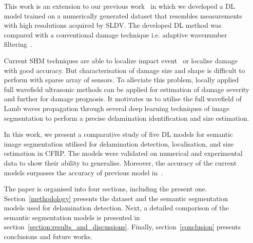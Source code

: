 This work is an extension to our previous work~\cite{Ijjeh2021} in which we developed a DL model trained on a numerically generated dataset that resembles measurements with high resolutions acquired by SLDV.
The developed DL method was compared with a conventional damage technique i.e. adaptive wavenumber filtering~\cite{Kudela2015, Radzienski2019a}.

Current SHM techniques are able to localize impact event~\cite{Ciampa2012} or localise damage~\cite{Nokhbatolfoghahai2020} with good accuracy. 
But characterisation of damage size and shape is difficult to perform with sparse array of sensors. 
To alleviate this problem, locally applied full wavefield ultrasonic methods can be applied for estimation of damage severity and further for damage prognosis.
It motivates us to utilise the full wavefield of Lamb waves propagation through several deep learning techniques of image segmentation to perform a precise delamination identification and size estimation.

In this work, we present a comparative study of five DL models for semantic image segmentation utilised for delamination detection, localisation, and size estimation in CFRP.
The models were validated on numerical and experimental data to show their ability to generalise.
Moreover, the accuracy of the current models surpasses the accuracy of previous model in~\cite{Ijjeh2021}.         

The paper is organised into four sections, including the present one.
Section~\ref{methodology} presents the dataset and the semantic segmentation models used for delamination detection. 
Next, a detailed comparison of the semantic segmentation models is presented in section~\ref{section:results_and_discussions}.
Finally, section~\ref{conclusion} presents conclusions and future works.